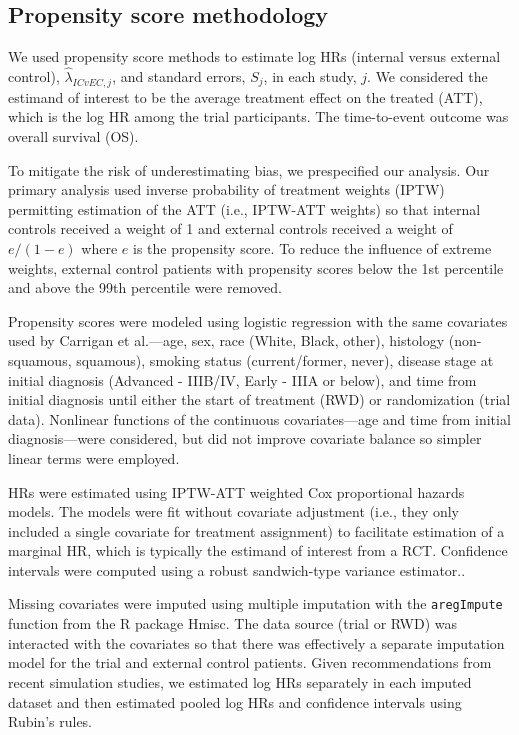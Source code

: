 \documentclass[11pt,final,fleqn]{article}\usepackage[]{graphicx}\usepackage[]{color}
\newcommand{\pkg}[1]{{\fontseries{m}\fontseries{b}\selectfont #1}}
\begin{document}
\subsection{Propensity score methodology} \label{subsec:propensity-score}
We used propensity score methods to estimate log HRs (internal versus external control), $\hat{\lambda}_{ICvEC,j}$, and standard errors, $S_j$, in each study, $j$. We considered the estimand of interest to be the average treatment effect on the treated (ATT), which is the log HR among the trial participants. The time-to-event outcome was overall survival (OS).

To mitigate the risk of underestimating bias, we prespecified our analysis. Our primary analysis used inverse probability of treatment weights (IPTW) permitting estimation of the ATT (i.e., IPTW-ATT weights) so that internal controls received a weight of 1 and external controls received a weight of $e/(1-e)$ where $e$ is the propensity score.\cite{austin2015moving} To reduce the influence of extreme weights, external control patients with propensity scores below the 1st percentile and above the 99th percentile were removed. 

Propensity scores were modeled using logistic regression with the same covariates used by Carrigan et al.\cite{carrigan2020using}---age, sex, race (White, Black, other), histology (non-squamous, squamous), smoking status (current/former, never), disease stage at initial diagnosis (Advanced - IIIB/IV, Early - IIIA or below), and time from initial diagnosis until either the start of treatment (RWD) or randomization (trial data). Nonlinear functions of the continuous covariates---age and time from initial diagnosis---were considered, but did not improve covariate balance so simpler linear terms were employed.

HRs were estimated using IPTW-ATT weighted Cox proportional hazards models. The models were fit without covariate adjustment (i.e., they only included a single covariate for treatment assignment) to facilitate estimation of a marginal HR,\cite{daniel2021making} which is typically the estimand of interest from a RCT. Confidence intervals were computed using a robust sandwich-type variance estimator.\cite{austin2014use}. 

Missing covariates were imputed using multiple imputation with the \texttt{aregImpute} function from the \textsf{R}  package \pkg{Hmisc}.\cite{Hmisc2021} The data source (trial or RWD) was interacted with the covariates so that there was effectively a separate imputation model for the trial and external control patients. Given recommendations from recent simulation studies, we estimated log HRs separately in each imputed dataset and then estimated pooled log HRs and confidence intervals using Rubin's rules.\cite{leyrat2019propensity,granger2019avoiding}
\end{document}
